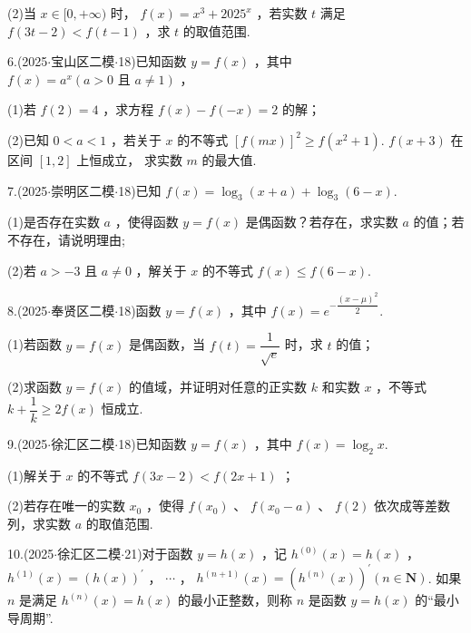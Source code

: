(2)当 $x \in  \lbrack 0, + \infty )$ 时， $f\left( x\right)  = {x}^{3} + {2025}^{x}$ ，若实数 $t$ 满足 $f\left( {{3t} - 2}\right)  < f\left( {t - 1}\right)$ ，求 $t$ 的取值范围.

6.(2025$\cdot$宝山区二模$\cdot$18)已知函数 $y = f\left( x\right)$ ，其中 $f\left( x\right)  = {a}^{x}\left( {a > 0\text{ 且 }a \neq  1}\right)$ ，

(1)若 $f\left( 2\right)  = 4$ ，求方程 $f\left( x\right)  - f\left( {-x}\right)  = 2$ 的解；

(2)已知 $0 < a < 1$ ，若关于 $x$ 的不等式 ${\left\lbrack  f\left( mx\right) \right\rbrack  }^{2} \geq  f\left( {{x}^{2} + 1}\right)$. $f\left( {x + 3}\right)$ 在区间 $\left\lbrack  {1,2}\right\rbrack$ 上恒成立， 求实数 $m$ 的最大值.

7.(2025$\cdot$崇明区二模$\cdot$18)已知 $f\left( x\right)  = {\log }_{3}\left( {x + a}\right)  + {\log }_{3}\left( {6 - x}\right)$.

(1)是否存在实数 $a$ ，使得函数 $y = f\left( x\right)$ 是偶函数？若存在，求实数 $a$ 的值；若不存在，请说明理由;

(2)若 $a >  - 3$ 且 $a \neq  0$ ，解关于 $x$ 的不等式 $f\left( x\right)  \leq  f\left( {6 - x}\right)$.

8.(2025$\cdot$奉贤区二模$\cdot$18)函数 $y = f\left( x\right)$ ，其中 $f\left( x\right)  = {{e}}^{-\dfrac{{\left( x - \mu \right) }^{2}}{2}}$.

(1)若函数 $y = f\left( x\right)$ 是偶函数，当 $f\left( t\right)  = \dfrac{1}{\sqrt{{e}}}$ 时，求 $t$ 的值；

(2)求函数 $y = f\left( x\right)$ 的值域，并证明对任意的正实数 $k$ 和实数 $x$ ，不等式 $k + \dfrac{1}{k} \geq  {2f}\left( x\right)$ 恒成立.

9.(2025$\cdot$徐汇区二模$\cdot$18)已知函数 $y = f\left( x\right)$ ，其中 $f\left( x\right)  = {\log }_{2}x$.

(1)解关于 $x$ 的不等式 $f\left( {{3x} - 2}\right)  < f\left( {{2x} + 1}\right)$ ；

(2)若存在唯一的实数 ${x}_{0}$ ，使得 $f\left( {x}_{0}\right)$ 、 $f\left( {{x}_{0} - a}\right)$ 、 $f\left( 2\right)$ 依次成等差数列，求实数 $a$ 的取值范围.

10.(2025$\cdot$徐汇区二模$\cdot$21)对于函数 $y = h\left( x\right)$ ，记 ${h}^{\left( 0\right) }\left( x\right)  = h\left( x\right)$ ， ${h}^{\left( 1\right) }\left( x\right)  = {\left( h\left( x\right) \right) }^{\prime }$ ， $\cdots$ ， ${h}^{\left( n + 1\right) }\left( x\right)  = {\left( {h}^{\left( n\right) }\left( x\right) \right) }^{\prime }\left( {n \in  \mathbf{N}}\right)$. 如果 $n$ 是满足 ${h}^{\left( n\right) }\left( x\right)  = h\left( x\right)$ 的最小正整数，则称 $n$ 是函数 $y =  h\left( x\right)$ 的“最小导周期”.

